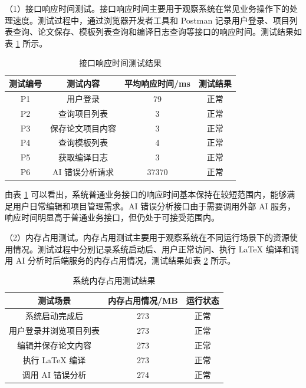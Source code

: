 \documentclass{xduugthesis}
\begin{document}
（1）接口响应时间测试。接口响应时间主要用于观察系统在常见业务操作下的处理速度。测试过程中，通过浏览器开发者工具和 Postman 记录用户登录、项目列表查询、论文保存、模板列表查询和编译日志查询等接口的响应时间。测试结果如表 \ref{tab:response-time-test} 所示。

\begin{table}[!ht]
    \centering
    \caption{接口响应时间测试结果}
    \label{tab:response-time-test}
    \begin{tabular}{|c|c|c|c|}
        \hline
        测试编号 & 测试内容 & 平均响应时间/ms & 测试结果 \\
        \hline
        P1 & 用户登录 & 79 & 正常 \\
        \hline
        P2 & 查询项目列表 & 3 & 正常 \\
        \hline
        P3 & 保存论文项目内容 & 3 & 正常 \\
        \hline
        P4 & 查询模板列表 & 4 & 正常 \\
        \hline
        P5 & 获取编译日志 & 3 & 正常 \\
        \hline
        P6 & AI 错误分析请求 & 37370 & 正常 \\
        \hline
    \end{tabular}
\end{table}

由表 \ref{tab:response-time-test} 可以看出，系统普通业务接口的响应时间基本保持在较短范围内，能够满足用户日常编辑和项目管理需求。AI 错误分析接口由于需要调用外部 AI 服务，响应时间明显高于普通业务接口，但仍处于可接受范围内。

（2）内存占用测试。内存占用测试主要用于观察系统在不同运行场景下的资源使用情况。测试过程中分别记录系统启动后、用户正常访问、执行 LaTeX 编译和调用 AI 分析时后端服务的内存占用情况，测试结果如表 \ref{tab:memory-test} 所示。

\begin{table}[!ht]
    \centering
    \caption{系统内存占用测试结果}
    \label{tab:memory-test}
    \begin{tabular}{|c|c|c|}
        \hline
        测试场景 & 内存占用情况/MB & 运行状态 \\
        \hline
        系统启动完成后 & 273 & 正常 \\
        \hline
        用户登录并浏览项目列表 & 273 & 正常 \\
        \hline
        编辑并保存论文内容 & 273 & 正常 \\
        \hline
        执行 LaTeX 编译 & 273 & 正常 \\
        \hline
        调用 AI 错误分析 & 274 & 正常 \\
        \hline
    \end{tabular}
\end{table}
\end{document}
